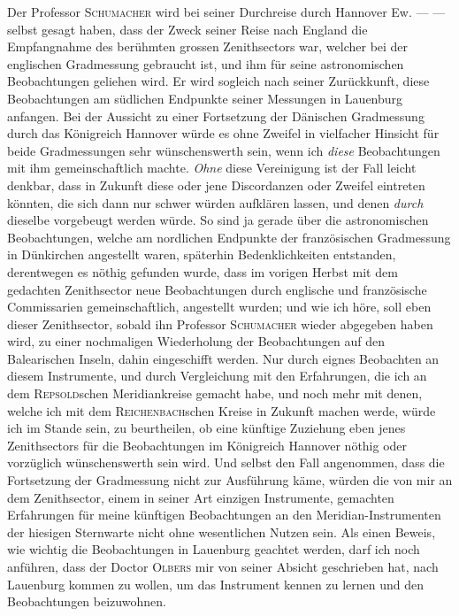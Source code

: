 Der Professor \textsc{Schumacher} wird bei seiner Durchreise durch Hannover Ew. — — selbst gesagt haben, dass der Zweck seiner Reise nach England die Empfangnahme des berühmten grossen Zenithsectors war, welcher bei der englischen Gradmessung gebraucht ist, und ihm für seine astronomischen Beobachtungen geliehen wird. Er wird sogleich nach seiner Zurückkunft, diese Beobachtungen am südlichen Endpunkte seiner Messungen in Lauenburg anfangen. Bei der Aussicht zu einer Fortsetzung der Dänischen Gradmessung durch das Königreich Hannover würde es ohne Zweifel in vielfacher Hinsicht für beide Gradmessungen sehr wünschenswerth sein, wenn ich \textit{diese} Beobachtungen mit ihm gemeinschaftlich machte. \textit{Ohne} diese Vereinigung ist der Fall leicht denkbar, dass in Zukunft diese oder jene Discordanzen oder Zweifel eintreten könnten, die sich dann nur schwer würden aufklären lassen, und denen \textit{durch} dieselbe vorgebeugt werden würde. So sind ja gerade über die astronomischen Beobachtungen, welche am nordlichen Endpunkte der französischen Gradmessung in Dünkirchen angestellt waren, späterhin Bedenklichkeiten entstanden, derentwegen es nöthig gefunden wurde, dass im vorigen Herbst mit dem gedachten Zenithsector neue Beobachtungen durch englische und französische Commissarien gemeinschaftlich, angestellt wurden; und wie ich höre, soll eben dieser Zenithsector, sobald ihn Professor \textsc{Schumacher} wieder abgegeben haben wird, zu einer nochmaligen Wiederholung der Beobachtungen auf den Balearischen Inseln, dahin eingeschifft werden. Nur durch eignes Beobachten an diesem Instrumente, und durch Vergleichung mit den Erfahrungen, die ich an dem \textsc{Repsold}schen Meridiankreise gemacht habe, und noch mehr mit denen, welche ich mit dem \textsc{Reichenbach}schen Kreise in Zukunft machen werde, würde ich im Stande sein, zu beurtheilen, ob eine künftige Zuziehung eben jenes Zenithsectors für die Beobachtungen im Königreich Hannover nöthig oder vorzüglich wünschenswerth sein wird. Und selbst den Fall angenommen, dass die Fortsetzung der Gradmessung nicht zur Ausführung käme, würden die von mir an dem Zenithsector, einem in seiner Art einzigen Instrumente, gemachten Erfahrungen für meine künftigen Beobachtungen an den Meridian-Instrumenten der hiesigen Sternwarte nicht ohne wesentlichen Nutzen sein. Als einen Beweis, wie wichtig die Beobachtungen in Lauenburg geachtet werden, darf ich noch anführen, dass der Doctor \textsc{Olbers} mir von seiner Absicht geschrieben hat, nach Lauenburg kommen zu wollen, um das Instrument kennen zu lernen und den Beobachtungen beizuwohnen.
